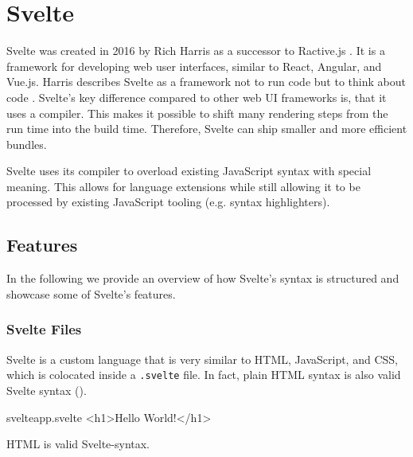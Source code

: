 \section{Svelte}
\label{sec:svelte}

Svelte was created in 2016 by Rich Harris as a successor to Ractive.js \cite{offerzen_origins_svelte_2022}. It is a framework for developing web user interfaces, similar to React, Angular, and Vue.js. Harris describes Svelte as a framework not to run code but to think about code \cite{offerzen_origins_svelte_2022}. Svelte's key difference compared to other web UI frameworks is, that it uses a compiler. This makes it possible to shift many rendering steps from the run time into the build time. Therefore, Svelte can ship smaller and more efficient bundles. 

Svelte uses its compiler to overload existing JavaScript syntax with special meaning. This allows for language extensions while still allowing it to be processed by existing JavaScript tooling (e.g. syntax highlighters).

\subsection{Features}

In the following we provide an overview of how Svelte's syntax is structured and showcase some of Svelte's features.

\subsubsection{Svelte Files}
\label{sec:svelte-file}

Svelte is a custom language that is very similar to HTML, JavaScript, and CSS, which is colocated inside a \texttt{.svelte} file. In fact, plain HTML syntax is also valid Svelte syntax ().

\begin{listing}[h!]
\begin{myminted}{svelte}{app.svelte}
<h1>Hello World!</h1>
\end{myminted}
\caption{HTML is valid Svelte-syntax.}
\label{fig:svelte-basic-html}
\end{listing}

